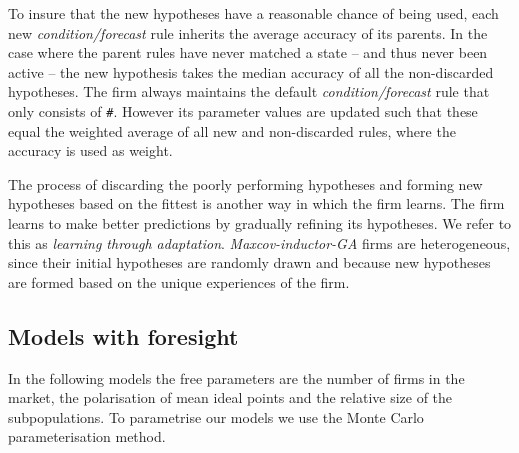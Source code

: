 \documentclass[preprint, 12pt]{elsarticle}
\begin{document}
To insure that the new hypotheses have a reasonable chance of being used, each new \emph{condition/forecast} rule inherits the average accuracy of its parents. In the case where the parent rules have never matched a state -- and thus never been active -- the new hypothesis takes the median accuracy of all the non-discarded hypotheses. The firm always maintains the default \emph{condition/forecast} rule that only consists of \texttt{\#}. However its parameter values are updated such that these equal the weighted average of all new and non-discarded rules, where the accuracy is used as weight.

The process of discarding the poorly performing hypotheses and forming new hypotheses based on the fittest is another way in which the firm learns. The firm learns to make better predictions by gradually refining its hypotheses. We refer to this as \emph{learning through adaptation}. \emph{Maxcov-inductor-GA} firms are heterogeneous, since their initial hypotheses are randomly drawn and because new hypotheses are formed based on the unique experiences of the firm.

\subsection{Models with foresight}

In the following models the free parameters are the number of firms in the market, the polarisation of mean ideal points and the relative size of the subpopulations. To parametrise our models we use the Monte Carlo parameterisation method. 
\end{document}
